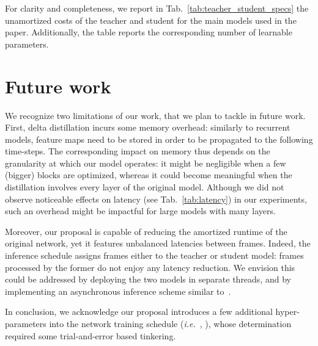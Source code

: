 \documentclass[runningheads]{llncs}
\newcommand{\closesupplement}{
    \renewcommand\thesection{\arabic{section}}
}
\begin{document}
For clarity and completeness, we report in Tab.~\ref{tab:teacher_student_specs} the unamortized costs of the teacher and student for the main models used in the paper.
Additionally, the table reports the corresponding number of learnable parameters. \section{Future work}
We recognize two limitations of our work, that we plan to tackle in future work.
First, delta distillation incurs some memory overhead: similarly to recurrent models, feature maps need to be stored in order to be propagated to the following time-steps.
The corresponding impact on memory thus depends on the granularity at which our model operates: it might be negligible when a few (bigger) blocks are optimized, whereas it could become meaningful when the distillation involves every layer of the original model.
Although we did not observe noticeable effects on latency (see Tab.~\ref{tab:latency}) in our experiments, such an overhead might be impactful for large models with many layers.

Moreover, our proposal is capable of reducing the amortized runtime of the original network, yet it features unbalanced latencies between frames.
Indeed, the inference schedule assigns frames either to the teacher or student model: frames processed by the former do not enjoy any latency reduction.
We envision this could be addressed by deploying the two models in separate threads, and by implementing an asynchronous inference scheme similar to~\cite{liu2019looking}.

In conclusion, we acknowledge our proposal introduces a few additional hyper-parameters into the network training schedule (\emph{i.e.}~, ), whose determination required some trial-and-error based tinkering.
\end{document}
